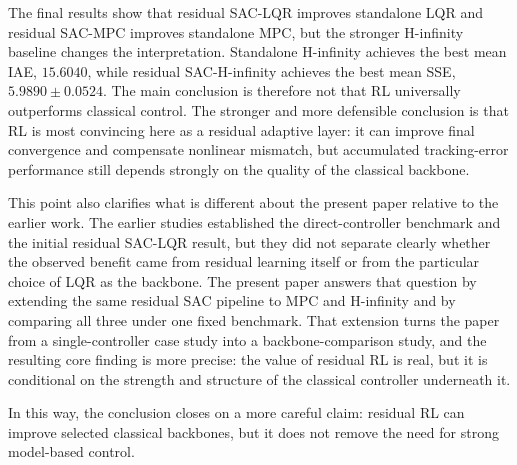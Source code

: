 \documentclass[conference]{IEEEtran}
\begin{document}
The final results show that residual SAC-LQR improves standalone LQR and residual SAC-MPC improves standalone MPC, but the stronger H-infinity baseline changes the interpretation. Standalone H-infinity achieves the best mean IAE, $15.6040$, while residual SAC-H-infinity achieves the best mean SSE, $5.9890 \pm 0.0524$. The main conclusion is therefore not that RL universally outperforms classical control. The stronger and more defensible conclusion is that RL is most convincing here as a residual adaptive layer: it can improve final convergence and compensate nonlinear mismatch, but accumulated tracking-error performance still depends strongly on the quality of the classical backbone.

This point also clarifies what is different about the present paper relative to the earlier work. The earlier studies established the direct-controller benchmark and the initial residual SAC-LQR result, but they did not separate clearly whether the observed benefit came from residual learning itself or from the particular choice of LQR as the backbone. The present paper answers that question by extending the same residual SAC pipeline to MPC and H-infinity and by comparing all three under one fixed benchmark. That extension turns the paper from a single-controller case study into a backbone-comparison study, and the resulting core finding is more precise: the value of residual RL is real, but it is conditional on the strength and structure of the classical controller underneath it.

In this way, the conclusion closes on a more careful claim: residual RL can improve selected classical backbones, but it does not remove the need for strong model-based control.
\end{document}
